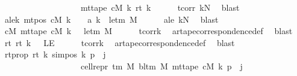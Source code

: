 \begin{isabellebody}
\ \ \ \ \ \ \ \ \ \ \ \ \ \ \ \ \ \ \ {\isacharparenleft}{\kern0pt}mt{\isacharunderscore}{\kern0pt}tape\ cM\ k{\isacharparenright}{\kern0pt}\ {\isacharparenleft}{\kern0pt}rt\ k{\isacharparenright}{\kern0pt}{\isachardoublequoteclose}\isanewline
\ \ \ \ \isamarkupfalse%
\ tcorr\ kN\ \isamarkupfalse%
\ blast\isanewline
\ \ \isamarkupfalse%
\ a{\isacharprime}{\kern0pt}le{}{\isacharunderscore}{\kern0pt}k{\isacharcolon}{\kern0pt}\ {\isachardoublequoteopen}mt{\isacharunderscore}{\kern0pt}pos\ cM\ k\ {\isacharequal}{\kern0pt}\ {}\ {\isasymlongrightarrow}\ a{\isacharprime}{\kern0pt}\ k\ {\isacharequal}{\kern0pt}\ le{\isacharunderscore}{\kern0pt}tm\ M{\isachardoublequoteclose}\isanewline
\ \ \ \ \isamarkupfalse%
\ a{\isacharprime}{\kern0pt}le{}\ kN\ \isamarkupfalse%
\ blast\isanewline
\ \ \isamarkupfalse%
\ cM{}{\isacharcolon}{\kern0pt}\ {\isachardoublequoteopen}mt{\isacharunderscore}{\kern0pt}tape\ cM\ k\ {}\ {\isacharequal}{\kern0pt}\ le{\isacharunderscore}{\kern0pt}tm\ M{\isachardoublequoteclose}\isanewline
\ \ \ \ \isamarkupfalse%
\ tcorr{\isacharunderscore}{\kern0pt}k\ \isamarkupfalse%
\ ar{\isacharunderscore}{\kern0pt}tape{\isacharunderscore}{\kern0pt}correspondence{\isacharunderscore}{\kern0pt}def\ \isamarkupfalse%
\ blast\isanewline
\ \ \isamarkupfalse%
\ rt{}{\isacharcolon}{\kern0pt}\ {\isachardoublequoteopen}rt\ k\ {}\ {\isacharequal}{\kern0pt}\ LE{}{\isachardoublequoteclose}\isanewline
\ \ \ \ \isamarkupfalse%
\ tcorr{\isacharunderscore}{\kern0pt}k\ \isamarkupfalse%
\ ar{\isacharunderscore}{\kern0pt}tape{\isacharunderscore}{\kern0pt}correspondence{\isacharunderscore}{\kern0pt}def\ \isamarkupfalse%
\ blast\isanewline
\ \ \isamarkupfalse%
\ rtprop{\isacharcolon}{\kern0pt}\ {\isachardoublequoteopen}rt\ k\ {\isacharparenleft}{\kern0pt}sim{\isacharunderscore}{\kern0pt}pos\ {\isacharquery}{\kern0pt}k\ p\ {\isacharplus}{\kern0pt}\ j{\isacharparenright}{\kern0pt}\isanewline
\ \ \ \ \ \ \ \ \ \ \ \ \ \ \ \ \ \ {\isacharequal}{\kern0pt}\ cell{\isacharunderscore}{\kern0pt}repr\ {\isacharparenleft}{\kern0pt}{\isasymGamma}{\isacharunderscore}{\kern0pt}tm\ M{\isacharparenright}{\kern0pt}\ {\isacharparenleft}{\kern0pt}bl{\isacharunderscore}{\kern0pt}tm\ M{\isacharparenright}{\kern0pt}\ {\isacharparenleft}{\kern0pt}mt{\isacharunderscore}{\kern0pt}tape\ cM\ k\ p{\isacharparenright}{\kern0pt}\ {\isacharbang}{\kern0pt}\ j{\isachardoublequoteclose}\isanewline

\end{isabellebody}
